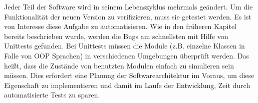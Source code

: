 Jeder Teil der Software wird in seinem Lebenszyklus mehrmals geändert. 
Um die Funktionalität der neuen Version zu verifizieren, muss sie getestet werden.
Es ist von Interesse diese Aufgabe zu automatisieren. 
Wie in den früheren Kapitel bereits beschrieben wurde, werden die Bugs am schnellsten mit Hilfe von Unittests gefunden. 
Bei Unittests müssen die Module (z.B. einzelne Klassen in Falle von OOP Sprachen) in verschiedenen Umgebungen überprüft werden. 
Das heißt, dass die Zustände von benutzten Modulen einfach zu simulieren sein müssen.
Dies erfordert eine Planung der Softwarearchitektur im Voraus, 
um diese Eigenschaft zu implementieren und damit im Laufe der Entwicklung, Zeit durch automatisierte Tests zu sparen.
